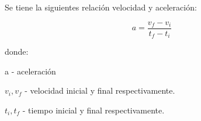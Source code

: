 \begin{frame}

Se tiene la siguientes relación velocidad y aceleración:

$$
a = \frac{v_f - v_i}{t_f - t_i}
$$

donde:

a - aceleración

$v_i, v_f$ - velocidad inicial y final respectivamente.

$t_i, t_f$ - tiempo inicial y final respectivamente.

\end{frame}
